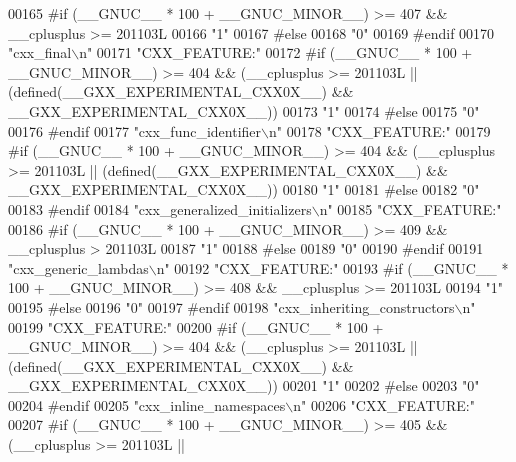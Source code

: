 \begin{DoxyCode}
00165 \textcolor{preprocessor}{#if (\_\_GNUC\_\_ * 100 + \_\_GNUC\_MINOR\_\_) >= 407 && \_\_cplusplus >= 201103L}
00166 \textcolor{stringliteral}{"1"}
00167 \textcolor{preprocessor}{#else}
00168 \textcolor{stringliteral}{"0"}
00169 \textcolor{preprocessor}{#endif}
00170 \textcolor{stringliteral}{"cxx\_final\(\backslash\)n"}
00171 \textcolor{stringliteral}{"CXX\_FEATURE:"}
00172 \textcolor{preprocessor}{#if (\_\_GNUC\_\_ * 100 + \_\_GNUC\_MINOR\_\_) >= 404 && (\_\_cplusplus >= 201103L ||
       (defined(\_\_GXX\_EXPERIMENTAL\_CXX0X\_\_) && \_\_GXX\_EXPERIMENTAL\_CXX0X\_\_))}
00173 \textcolor{stringliteral}{"1"}
00174 \textcolor{preprocessor}{#else}
00175 \textcolor{stringliteral}{"0"}
00176 \textcolor{preprocessor}{#endif}
00177 \textcolor{stringliteral}{"cxx\_func\_identifier\(\backslash\)n"}
00178 \textcolor{stringliteral}{"CXX\_FEATURE:"}
00179 \textcolor{preprocessor}{#if (\_\_GNUC\_\_ * 100 + \_\_GNUC\_MINOR\_\_) >= 404 && (\_\_cplusplus >= 201103L ||
       (defined(\_\_GXX\_EXPERIMENTAL\_CXX0X\_\_) && \_\_GXX\_EXPERIMENTAL\_CXX0X\_\_))}
00180 \textcolor{stringliteral}{"1"}
00181 \textcolor{preprocessor}{#else}
00182 \textcolor{stringliteral}{"0"}
00183 \textcolor{preprocessor}{#endif}
00184 \textcolor{stringliteral}{"cxx\_generalized\_initializers\(\backslash\)n"}
00185 \textcolor{stringliteral}{"CXX\_FEATURE:"}
00186 \textcolor{preprocessor}{#if (\_\_GNUC\_\_ * 100 + \_\_GNUC\_MINOR\_\_) >= 409 && \_\_cplusplus > 201103L}
00187 \textcolor{stringliteral}{"1"}
00188 \textcolor{preprocessor}{#else}
00189 \textcolor{stringliteral}{"0"}
00190 \textcolor{preprocessor}{#endif}
00191 \textcolor{stringliteral}{"cxx\_generic\_lambdas\(\backslash\)n"}
00192 \textcolor{stringliteral}{"CXX\_FEATURE:"}
00193 \textcolor{preprocessor}{#if (\_\_GNUC\_\_ * 100 + \_\_GNUC\_MINOR\_\_) >= 408 && \_\_cplusplus >= 201103L}
00194 \textcolor{stringliteral}{"1"}
00195 \textcolor{preprocessor}{#else}
00196 \textcolor{stringliteral}{"0"}
00197 \textcolor{preprocessor}{#endif}
00198 \textcolor{stringliteral}{"cxx\_inheriting\_constructors\(\backslash\)n"}
00199 \textcolor{stringliteral}{"CXX\_FEATURE:"}
00200 \textcolor{preprocessor}{#if (\_\_GNUC\_\_ * 100 + \_\_GNUC\_MINOR\_\_) >= 404 && (\_\_cplusplus >= 201103L ||
       (defined(\_\_GXX\_EXPERIMENTAL\_CXX0X\_\_) && \_\_GXX\_EXPERIMENTAL\_CXX0X\_\_))}
00201 \textcolor{stringliteral}{"1"}
00202 \textcolor{preprocessor}{#else}
00203 \textcolor{stringliteral}{"0"}
00204 \textcolor{preprocessor}{#endif}
00205 \textcolor{stringliteral}{"cxx\_inline\_namespaces\(\backslash\)n"}
00206 \textcolor{stringliteral}{"CXX\_FEATURE:"}
00207 \textcolor{preprocessor}{#if (\_\_GNUC\_\_ * 100 + \_\_GNUC\_MINOR\_\_) >= 405 && (\_\_cplusplus >= 201103L ||
}
\end{DoxyCode}

